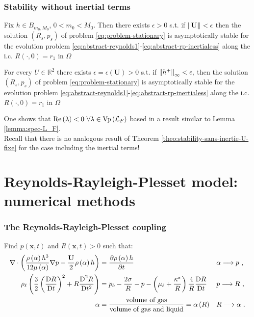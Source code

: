 \documentclass[10pt,aspectratio=169]{beamer}
\begin{document}
\begin{frame}\frametitle{Stability without inertial terms}
\begin{theorem} \label{theo:stability-sans-inertie-h-fix}
	Fix $h\in B_{m_0,M_0}$, $0<m_0<M_0$. Then there exists $\epsilon>0$ s.t. if $\left\lVert\mathbf{U}\right\rVert_{}<\epsilon$ then the solution $\left(R_s,p_s\right)$ of problem \eqref{eq:problem-stationary} is asymptotically stable for the evolution problem \eqref{eq:abstract-reynolds1}-\eqref{eq:abstract-rp-inertialess} along the i.c. $R\left(\cdot,0\right)=r_1$ in $\Omega$
\end{theorem}
\begin{theorem}\label{theo:stability-sans-inertie-U-fixe} For every $U\in \mathbb{R}^2$ there exists $\epsilon=\epsilon\left(\mathbf{U}\right)>0$ s.t. if $\left\lVert h^+\right\rVert_{\infty}<\epsilon$, then the solution $\left(R_s,p_s\right)$ of problem \eqref{eq:problem-stationary} is asymptotically stable for the evolution problem \eqref{eq:abstract-reynolds1}-\eqref{eq:abstract-rp-inertialess} along the i.c. $R\left(\cdot,0\right)=r_1$ in $\Omega$
\end{theorem}\bigskip

One shows that $\mbox{Re}\left(\lambda\right)<0~\forall \lambda\in \textnormal{Vp}\left(\mathcal{L}_F\right)$ based in a result similar to Lemma \ref{lemma:spec-L_F}.\\
\bigskip
Recall that there is no analogous result of Theorem \ref{theo:stability-sans-inertie-U-fixe} for the case including the inertial terms!
\end{frame}

\setcounter{showSlideNumbers}{0}
\section{Reynolds-Rayleigh-Plesset model: numerical methods}
\setcounter{showSlideNumbers}{1}

\begin{frame}
\frametitle{The Reynolds-Rayleigh-Plesset coupling}

Find $p(\mathbf{x},t)$ and $R(\mathbf{x},t)>0$ such that:
\begin{align*}
\nabla\cdot\left(\frac{\rho\left(\alpha\right) h^3}{12\mu\left(\alpha\right) }\nabla p-\frac{\mathbf{U}}{2}\rho\left(\alpha\right) h \right)&=\frac{\partial \rho\left(\alpha\right) h}{\partial t}&&\alpha \longrightarrow p~,\\
\rho_\ell\left(\frac{3}{2}\left(\frac{\mbox{D} R}{\mbox{D} t}\right)^2+R\frac{\mbox{D}^2 R}{\mbox{D} {t}^2}\right)&=p_b-\frac{2\sigma}{R}-p-\left(\mu_\ell+\frac{\kappa^s}{R}\right)\frac{4}{R}\frac{\mbox{D} R}{\mbox{D} t}&&p\longrightarrow R~,\\
\alpha&=\frac{\mbox{volume of gas}}{\mbox{volume of gas and liquid}}=\alpha\left(R\right)&&R\longrightarrow \alpha~.
\end{align*}
\end{frame} 
\end{document}
